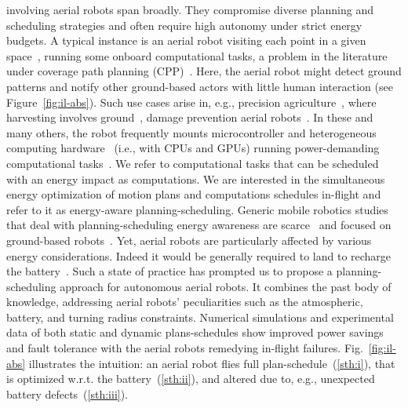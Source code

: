 \documentclass[letterpaper,10pt,journal,twoside]{IEEEtran}
\theoremstyle{definition}
\begin{document}
 involving aerial robots span broadly. They compromise diverse planning and scheduling strategies and often require high autonomy under strict energy budgets. A typical instance is an aerial robot visiting each point in a given space~\cite{cabreira2019survey}, running some onboard computational tasks, a problem in the literature under coverage path planning (CPP)~\cite{choset2001coverage,galceran2013survey}. Here, the aerial robot might detect ground patterns and notify other ground-based actors with little human interaction (see Figure~\ref{fig:il-abs}). Such use cases arise in, e.g., precision agriculture~\cite{hajjaj2014review}, where harvesting involves ground~\cite{qingchun2012study,dong2011development, de2011design, aljanobi2010setup, li2008analysis, edan2000robotic}, damage prevention aerial robots~\cite{puri2017agriculture, daponte2019review}. In these and many others, the robot frequently mounts microcontroller and heterogeneous computing hardware~\cite{mei2005case} (i.e., with CPUs and GPUs) running power-demanding computational tasks~\cite{william2019aerial, peng2019evaluating,wang2020yolo,alexey2021autonomous}. We refer to computational tasks that can be scheduled with an energy impact as computations. We are interested in the simultaneous energy optimization of motion plans and computations schedules in-flight and refer to it as energy-aware planning-scheduling. Generic mobile robotics studies that deal with planning-scheduling energy awareness are scarce~\cite{brateman2006energy,sudhakar2020balancing,lahijanian2018resource,ondruska2015scheduled} and focused on ground-based robots~\cite{mei2005case,sadrpour2013mission,lahijanian2018resource,ondruska2015scheduled,ho2019learning}. Yet, aerial robots are particularly affected by various energy considerations. Indeed it would be generally required to land to recharge the battery~\cite{zamanakos2020energy}. Such a state of practice has prompted us to propose a planning-scheduling approach for autonomous aerial robots. It combines the past body of knowledge, addressing aerial robots' peculiarities such as the atmospheric, battery, and turning radius constraints. Numerical simulations and experimental data of both static and dynamic plans-schedules show improved power savings and fault tolerance with the aerial robots remedying in-flight failures. Fig.~\ref{fig:il-abs} illustrates the intuition: an aerial robot flies full plan-schedule~(\ref{sth:i}), that is optimized w.r.t. the battery~(\ref{sth:ii}), and altered due to, e.g., unexpected battery defects~(\ref{sth:iii}).
\end{document}
